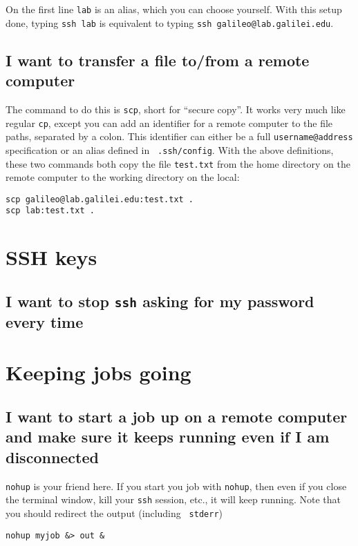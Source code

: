 On the first line {\tt lab} is an alias, which you can choose yourself. With
this setup done, typing {\tt ssh lab} is equivalent to typing {\tt ssh
galileo@lab.galilei.edu}.

\subsection{I want to transfer a file to/from a remote computer}

The command to do this is {\tt scp}, short for ``secure copy''. It works very
much like regular {\tt cp}, except you can add an identifier for a remote
computer to the file paths, separated by a colon. This identifier can either be
a full {\tt username@address} specification or an alias defined in {\tt
.ssh/config}. With the above definitions, these two commands both copy the file
{\tt test.txt} from the home directory on the remote computer to the working
directory on the local:

\begin{verbatim}
scp galileo@lab.galilei.edu:test.txt .
scp lab:test.txt .
\end{verbatim}

\section{SSH keys}

\subsection{I want to stop {\tt ssh} asking for my password every time}


\section{Keeping jobs going}

\subsection{I want to start a job up on a remote computer and make sure it
keeps running even if I am disconnected}

{\tt nohup} is your friend here. If you start you job with {\tt nohup}, then
even if you close the terminal window, kill your {\tt ssh} session, etc., it
will keep running. Note that you should redirect the output (including {\tt
stderr})

\begin{verbatim}
nohup myjob &> out &
\end{verbatim}

